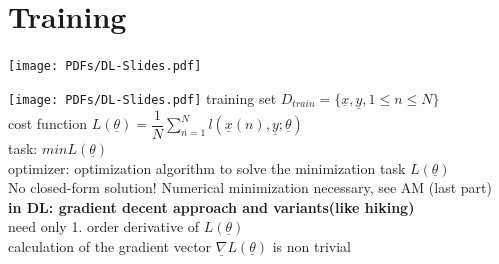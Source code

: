 \section{Training}
\texttt{[image: PDFs/DL-Slides.pdf]}

\texttt{[image: PDFs/DL-Slides.pdf]}
\textbullet training set $ D_{train} = \lbrace \underline{x} , \underline{y } , 1 \leq n \leq N \rbrace $\\
\textbullet cost function $ L(\underline{\theta}) = \dfrac{1}{N} \sum_{n=1}^{N} l(\underline{x}(n),\underline{y}; \underline{\theta}) $ \\
\textbullet task: $ min L(\underline{\theta}) $\\
\textbullet optimizer: optimization algorithm to solve the minimization task $ L(\underline{\theta}) $ \\
No closed-form solution! Numerical minimization necessary, see AM (last part) \\
\textbf{in DL: gradient decent approach and variants(like hiking)}\\
need only 1. order derivative of $ L(\underline{\theta}) $ \\
calculation of the gradient vector $  \underline{\nabla} L(\underline{\theta}) $ is non trivial \\
